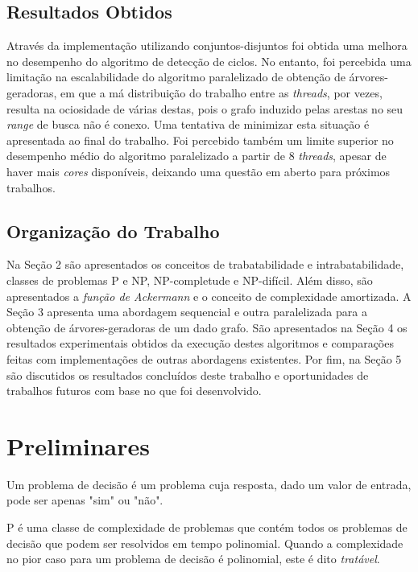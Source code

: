\documentclass[article,a4paper,12pt,brazil,sumario=tradicional]{abntex2}
\theoremstyle{definition} %
\begin{document}
\subsection{Resultados Obtidos}

Através da implementação utilizando conjuntos-disjuntos foi obtida uma melhora no desempenho do algoritmo de detecção de ciclos. No entanto, foi percebida uma limitação na escalabilidade do algoritmo paralelizado de obtenção de árvores-geradoras, em que a má distribuição do trabalho entre as \textit{threads}, por vezes, resulta na ociosidade de várias destas, pois o grafo induzido pelas arestas no seu \textit{range} de busca não é conexo. Uma tentativa de minimizar esta situação é apresentada ao final do trabalho. Foi percebido também um limite superior no desempenho médio do algoritmo paralelizado a partir de 8 \textit{threads}, apesar de haver mais \textit{cores} disponíveis, deixando uma questão em aberto para próximos trabalhos.

\subsection{Organização do Trabalho}

Na Seção 2 são apresentados os conceitos de trabatabilidade e intrabatabilidade, classes de problemas P e NP, NP-completude e NP-difícil. Além disso, são apresentados a \textit{função de Ackermann} e o conceito de complexidade amortizada. A Seção 3 apresenta uma abordagem sequencial e outra paralelizada para a obtenção de árvores-geradoras de um dado grafo. São apresentados na Seção 4 os resultados experimentais obtidos da execução destes algoritmos e comparações feitas com implementações de outras abordagens existentes. Por fim, na Seção 5 são discutidos os resultados concluídos deste trabalho e oportunidades de trabalhos futuros com base no que foi desenvolvido.

\section{Preliminares}

Um problema de decisão é um problema cuja resposta, dado um valor de entrada, pode ser apenas "sim" ou "não".

P é uma classe de complexidade de problemas que contém todos os problemas de decisão que podem ser resolvidos em tempo polinomial. Quando a complexidade no pior caso para um problema de decisão é polinomial, este é dito \textit{tratável}.
\end{document}
